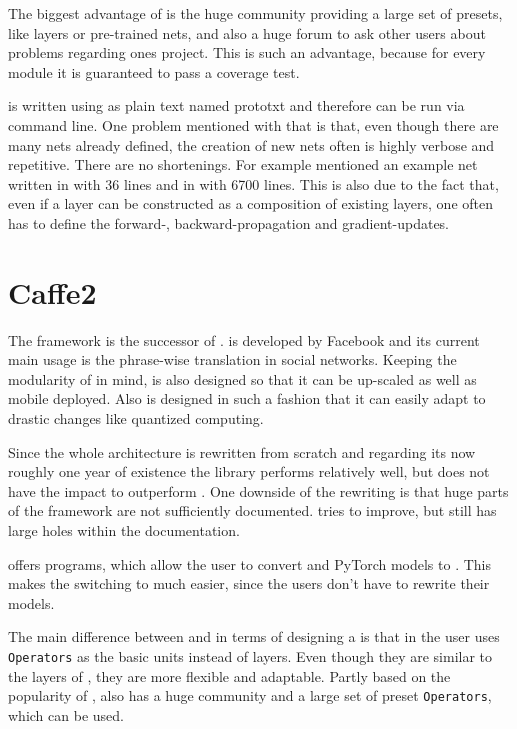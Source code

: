 The biggest advantage of \caffe is the huge community providing a large set of presets, like layers or pre-trained nets, and also a huge forum to ask other users about problems regarding ones project. This is such an advantage, because for every module it is  guaranteed to pass a coverage test. \cite{jia2014caffe}

\caffe is written using as plain text named prototxt and therefore can be run via command line. One problem mentioned with that is that, even though there are many nets already defined, the creation of new nets often is highly verbose and repetitive. There are no shortenings. For example \cite{tim2018CNNArchLang} mentioned an example net written in \cnnarch with 36 lines and in \caffe with 6700 lines. This is also due to the fact that, even if a layer can be constructed as a composition of existing layers, one often has to define the forward-, backward-propagation and gradient-updates.

\section{Caffe2} \label{sec: Caffe2}
The framework \caffetwo is the successor of \caffe. \caffetwo is developed by Facebook and its current main usage is the phrase-wise translation in social networks. Keeping the modularity of \caffe in mind, \caffetwo is also designed so that it can be up-scaled as well as mobile deployed. Also \caffetwo is designed in such a fashion that it can easily adapt to drastic changes like quantized computing. \cite{Caffe2Homepage}

Since the whole architecture is rewritten from scratch and regarding its now roughly one year of existence the library performs relatively well, but does not have the impact to outperform \caffe \cite{heise:Caffe2}.
One downside of the rewriting is that huge parts of the framework are not sufficiently documented. \caffetwo tries to improve, but still has large holes within the documentation. \cite{tim2018CNNArchLang}

\caffetwo offers programs, which allow the user to convert \caffe and PyTorch models to \caffetwo. This makes the switching to \caffetwo much easier, since the users don't have to rewrite their models. \cite{Caffe2Homepage}

The main difference between \caffe and \caffetwo in terms of designing a \nn is that in \caffetwo the user uses \texttt{Operators} as the basic units instead of layers. Even though they are similar to the layers of \caffe, they are more flexible and adaptable. Partly based on the popularity of \caffe, \caffetwo also has a huge community and a large set of preset \texttt{Operators}, which can be used. \cite{Caffe2Homepage}

